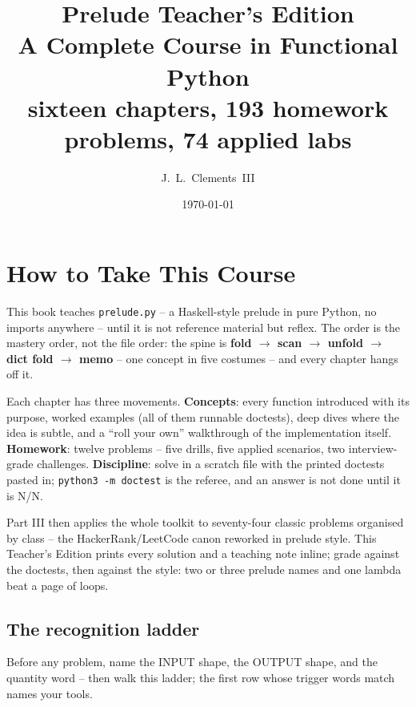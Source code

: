 \documentclass[10pt,letterpaper]{book}
\title{\Huge\bfseries Prelude Teacher's Edition\\[6pt]\Large A Complete Course in Functional Python\\[14pt]\normalsize sixteen chapters, 193 homework problems, 74 applied labs}
\author{J.~L.~Clements~III}
\date{\today}
\begin{document}
\frontmatter
\maketitle

\chapter{How to Take This Course}
This book teaches \texttt{prelude.py} -- a Haskell-style prelude in pure
Python, no imports anywhere -- until it is not reference material but
reflex. The order is the mastery order, not the file order: the spine is
\textbf{fold $\rightarrow$ scan $\rightarrow$ unfold $\rightarrow$ dict fold
$\rightarrow$ memo} -- one concept in five costumes -- and every chapter
hangs off it.

Each chapter has three movements. \textbf{Concepts}: every function
introduced with its purpose, worked examples (all of them runnable
doctests), deep dives where the idea is subtle, and a ``roll your own''
walkthrough of the implementation itself. \textbf{Homework}: twelve
problems -- five drills, five applied scenarios, two interview-grade
challenges. \textbf{Discipline}: solve in a scratch file with the printed
doctests pasted in; \texttt{python3 -m doctest} is the referee, and an
answer is not done until it is N/N.

Part III then applies the whole toolkit to seventy-four classic problems
organised by class -- the HackerRank/LeetCode canon reworked in prelude
style. This Teacher's Edition prints every solution and a teaching note inline; grade against the doctests, then against the style: two or three prelude names and one lambda beat a page of loops.

\section*{The recognition ladder}
Before any problem, name the INPUT shape, the OUTPUT shape, and the quantity
word -- then walk this ladder; the first row whose trigger words match names
your tools.
\end{document}
